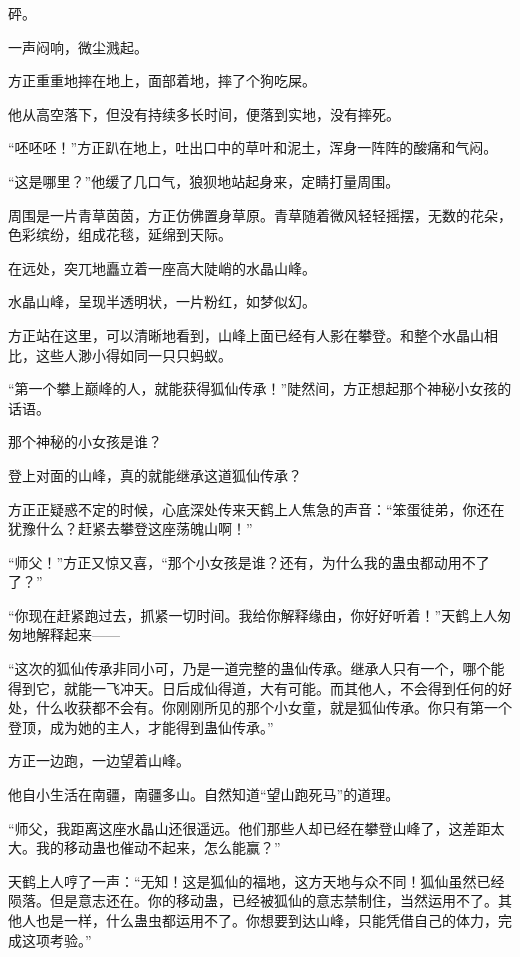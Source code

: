 
\begin{this_body}

砰。

一声闷响，微尘溅起。

方正重重地摔在地上，面部着地，摔了个狗吃屎。

他从高空落下，但没有持续多长时间，便落到实地，没有摔死。

“呸呸呸！”方正趴在地上，吐出口中的草叶和泥土，浑身一阵阵的酸痛和气闷。

“这是哪里？”他缓了几口气，狼狈地站起身来，定睛打量周围。

周围是一片青草茵茵，方正仿佛置身草原。青草随着微风轻轻摇摆，无数的花朵，色彩缤纷，组成花毯，延绵到天际。

在远处，突兀地矗立着一座高大陡峭的水晶山峰。

水晶山峰，呈现半透明状，一片粉红，如梦似幻。

方正站在这里，可以清晰地看到，山峰上面已经有人影在攀登。和整个水晶山相比，这些人渺小得如同一只只蚂蚁。

“第一个攀上巅峰的人，就能获得狐仙传承！”陡然间，方正想起那个神秘小女孩的话语。

那个神秘的小女孩是谁？

登上对面的山峰，真的就能继承这道狐仙传承？

方正正疑惑不定的时候，心底深处传来天鹤上人焦急的声音：“笨蛋徒弟，你还在犹豫什么？赶紧去攀登这座荡魄山啊！”

“师父！”方正又惊又喜，“那个小女孩是谁？还有，为什么我的蛊虫都动用不了了？”

“你现在赶紧跑过去，抓紧一切时间。我给你解释缘由，你好好听着！”天鹤上人匆匆地解释起来——

“这次的狐仙传承非同小可，乃是一道完整的蛊仙传承。继承人只有一个，哪个能得到它，就能一飞冲天。日后成仙得道，大有可能。而其他人，不会得到任何的好处，什么收获都不会有。你刚刚所见的那个小女童，就是狐仙传承。你只有第一个登顶，成为她的主人，才能得到蛊仙传承。”

方正一边跑，一边望着山峰。

他自小生活在南疆，南疆多山。自然知道“望山跑死马”的道理。

“师父，我距离这座水晶山还很遥远。他们那些人却已经在攀登山峰了，这差距太大。我的移动蛊也催动不起来，怎么能赢？”

天鹤上人哼了一声：“无知！这是狐仙的福地，这方天地与众不同！狐仙虽然已经陨落。但是意志还在。你的移动蛊，已经被狐仙的意志禁制住，当然运用不了。其他人也是一样，什么蛊虫都运用不了。你想要到达山峰，只能凭借自己的体力，完成这项考验。”


\end{this_body}
